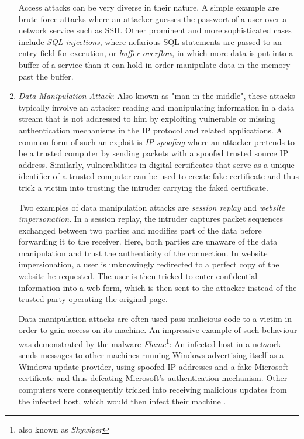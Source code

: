 \begin{enumerate}
Access attacks can be very diverse in their nature. A simple example are brute-force attacks where an attacker guesses the passwort of a user over a network service such as SSH. Other prominent and more sophisticated cases include \textit{SQL injections}, where nefarious SQL statements are passed to an entry field for execution, or \textit{buffer overflow}, in which more data is put into a buffer of a service than it can hold in order manipulate data in the memory past the buffer.


\item \textit{Data Manipulation Attack}: Also known as "man-in-the-middle", these attacks typically involve an attacker reading and manipulating information in a data stream that is not addressed to him by exploiting vulnerable or missing authentication mechanisms in the IP protocol and related applications. A common form of such an exploit is \textit{IP spoofing} where an attacker pretends to be a trusted computer by sending packets with a spoofed trusted source IP address. Similarly, vulnerabilities in digital certificates that serve as a unique identifier of a trusted computer can be used to create fake certificate and thus trick a victim into trusting the intruder carrying the faked certificate.

Two examples of data manipulation attacks are \textit{session replay} and \textit{website impersonation}. In a session replay, the intruder captures packet sequences exchanged between two parties and modifies part of the data before forwarding it to the receiver. Here, both parties are unaware of the data manipulation and trust the authenticity of the connection. In website impersionation, a user is unknowingly redirected to a perfect copy of the website he requested. The user is then tricked to enter confidential information into a web form, which is then sent to the attacker instead of the trusted party operating the original page. 


Data manipulation attacks are often used pass malicious code to a victim in order to gain access on its machine. An impressive example of such behaviour was demonstrated by the malware \textit{Flame}\footnote{also known as \textit{Skywiper}}: An infected host in a network sends messages to other machines running Windows advertising itself as a Windows update provider, using spoofed IP addresses and a fake Microsoft certificate and thus defeating Microsoft's authentication mechanism. Other computers were consequently tricked into receiving malicious updates from the infected host, which would then infect their machine \cite{skywiperskywiper}.




\end{enumerate}
